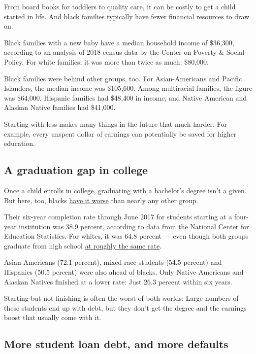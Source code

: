 From board books for toddlers to quality care, it can be costly to get a
child started in life. And black families typically have fewer financial
resources to draw on.

Black families with a new baby have a median household income of
\$36,300, according to an analysis of 2018 census data by the Center on
Poverty \& Social Policy. For white families, it was more than twice as
much: \$80,000.

Black families were behind other groups, too. For Asian-Americans and
Pacific Islanders, the median income was \$105,600. Among multiracial
families, the figure was \$64,000. Hispanic families had \$48,400 in
income, and Native American and Alaskan Native families had \$41,000.

Starting with less makes many things in the future that much harder. For
example, every unspent dollar of earnings can potentially be saved for
higher education.

\hypertarget{a-graduation-gap-in-college}{%
\subsection{A graduation gap in
college}\label{a-graduation-gap-in-college}}

Once a child enrolls in college, graduating with a bachelor's degree
isn't a given. But here, too, blacks
\href{https://www.nytimes3xbfgragh.onion/2018/03/25/opinion/college-graduation-gap.html}{have
it worse} than nearly any other group.

Their six-year completion rate through June 2017 for students starting
at a four-year institution was 38.9 percent, according to data from the
National Center for Education Statistics. For whites, it was 64.8
percent --- even though both groups graduate from high school
\href{https://nces.ed.gov/programs/dropout/ind_03.asp}{at roughly the
same rate}.

Asian-Americans (72.1 percent), mixed-race students (54.5 percent) and
Hispanics (50.5 percent) were also ahead of blacks. Only Native
Americans and Alaskan Natives finished at a lower rate: Just 26.3
percent within six years.

Starting but not finishing is often the worst of both worlds: Large
numbers of these students end up with debt, but they don't get the
degree and the earnings boost that usually come with it.

\hypertarget{more-student-loan-debt-and-more-defaults}{%
\subsection{More student loan debt, and more
defaults}\label{more-student-loan-debt-and-more-defaults}}

